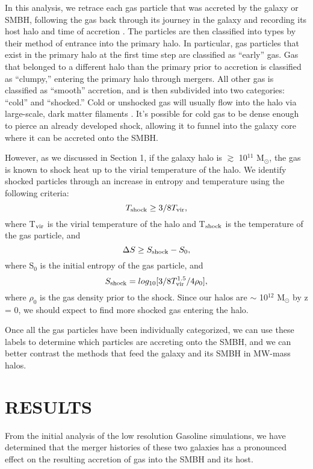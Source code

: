 \documentclass[12pt,headA,chapB]{fiskthesis}
\begin{document}
In this analysis, we retrace each gas particle that was accreted by the galaxy or SMBH, following the gas back through its journey in the galaxy and recording its host halo and time of accretion \citep{Brooks2009}. The particles are then classified into types by their method of entrance into the primary halo. In particular, gas particles that exist in the primary halo at the first time step are classified as ``early'' gas. Gas that belonged to a different halo than the primary prior to accretion is classified as ``clumpy,'' entering the primary halo through mergers. All other gas is classified as ``smooth'' accretion, and is then subdivided into two categories: ``cold'' and ``shocked.'' Cold or unshocked gas will usually flow into the halo via large-scale, dark matter filaments \citep{Bellovary2013}. It's possible for cold gas to be dense enough to pierce an already developed shock, allowing it to funnel into the galaxy core where it can be accreted onto the SMBH.

However, as we discussed in Section 1, if the galaxy halo is $\gtrsim$ 10$^{11}$ M$_{\odot} $, the gas is known to shock heat up to the virial temperature of the halo. We identify shocked particles through an increase in entropy and temperature using the following criteria:
\begin{equation}
T_{\rm shock} \geq 3/8 T_{\rm vir},
\end{equation}
where T$_{\rm vir}$ is the virial temperature of the halo and T$_{\rm shock}$ is the temperature of the gas particle, and 
\begin{equation}
\Delta S \geq S_{\rm shock} - S_0,
\end{equation}
where S$_0$ is the initial entropy of the gas particle, and 
\begin{equation}
S_{\rm shock} = log_{10}[3/8 T_{\rm vir}^{1.5}/4 \rho_0],
\end{equation}
where $\rho_0$ is the gas density prior to the shock. Since our halos are $\sim$ 10$^{12}$ M$_{\odot} $ by z = 0, we should expect to find more shocked gas entering the halo.

Once all the gas particles have been individually categorized, we can use these labels to determine which particles are accreting onto the SMBH, and we can better contrast the methods that feed the galaxy and its SMBH in MW-mass halos.


\chapter{\normalsize RESULTS}
\thispagestyle{empty}
From the initial analysis of the low resolution Gasoline simulations, we have determined that the merger histories of these two galaxies has a pronounced effect on the resulting accretion of gas into the SMBH and its host. 
\end{document}
